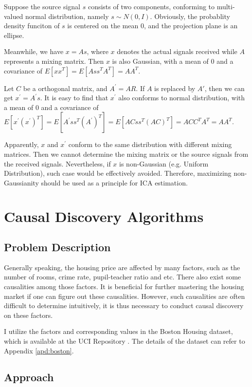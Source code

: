 \documentclass[12pt,a4paper]{article}
\theoremstyle{definition}
\begin{document}
Suppose the source signal $s$ consists of two components, conforming to multi-valued normal distribution, namely $s \sim N(0,I)$. Obviously, the probablity density funciton of $s$ is centered on the mean 0, and the projection plane is an ellipse.

Meanwhile, we have $x=As$, where $x$ denotes the actual signals received while $A$ represents a mixing matrix. Then $x$ is also Gaussian, with a mean of 0 and a covariance of $E[xx^{T}]=E[Ass^{T}A^{T}]=AA^{T}$.

Let $C$ be a orthogonal matrix, and $A^{'}=AR$. If $A$ is replaced by $A{'}$, then we can get $x^{'}=A^{'}s$. It is easy to find that $x^{'}$ also conforms to normal distribution, with a mean of 0 and a covariance of $E[x^{'}(x^{'})^{T}]=E[A^{'}ss^{T}(A^{'})^{T}]=E[ACss^{T}(AC)^{T}]=ACC^{T}A^{T}=AA^{T}$.

Apparently, $x$ and $x^{'}$ conform to the same distribution with different mixing matrices. Then we cannot determine the mixing matrix or the source signals from the received signals. Nevertheless, if $x$ is non-Gaussian (e.g. Uniform Distribution), such case would be effectively avoided. Therefore, maximizing non-Gaussianity should be used as a principle for ICA estimation.

\section{Causal Discovery Algorithms}

\subsection{Problem Description}

Generally speaking, the housing price are affected by many factors, such as the number of rooms, crime rate, pupil-teacher ratio and etc. There also exist some causalities among those factors. It is beneficial for further mastering the housing market if one can figure out these causalities. However, such causalities are often difficult to determine intuitively, it is thus necessary to conduct causal discovery on these factors.

I utilize the factors and corresponding values in the Boston Housing dataset, which is available at the UCI Repository \cite{boston}. The details of the dataset can refer to Appendix \ref{apd:boston}.

\subsection{Approach}
\end{document}
